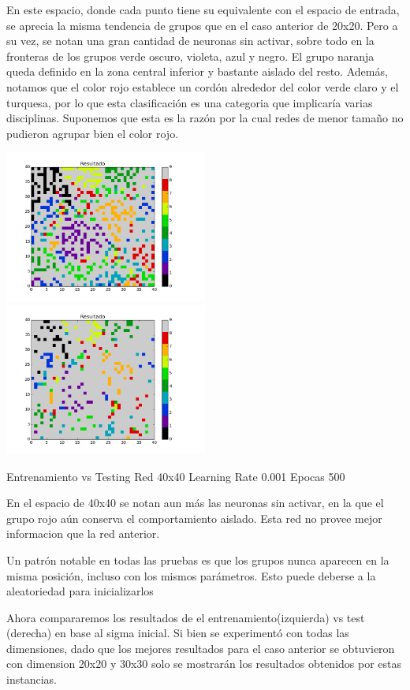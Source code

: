 En este espacio, donde cada punto tiene su equivalente con el espacio de entrada, se aprecia la misma tendencia de grupos que en el caso anterior de 20x20. Pero a su vez, se notan una gran cantidad de neuronas sin activar, sobre todo en la fronteras de los grupos verde oscuro, violeta, azul y negro. El grupo naranja queda definido en la zona central inferior y bastante aislado del resto. Adem\'as, notamos que el color rojo establece un cord\'on alrededor del color verde claro y el turquesa, por lo que esta clasificaci\'on es una categoria que implicar\'ia varias disciplinas. Suponemos que esta es la raz\'on por la cual redes de menor tama\~no no pudieron agrupar bien el color rojo.

\includegraphics[width=0.5\textwidth]{img/ej2_train_M_40_sigma_5_0_epocas_25}
\includegraphics[width=0.5\textwidth]{img/ej2_test_M_40_sigma_5_0_epocas_25}
{\footnotesize Entrenamiento vs Testing Red 40x40 Learning Rate 0.001 Epocas 500\par}	

En el espacio de 40x40 se notan aun m\'as las neuronas sin activar, en la que el grupo rojo a\'un conserva el comportamiento aislado. Esta red no provee mejor informacion que la red anterior.

Un patr\'on notable en todas las pruebas es que los grupos nunca aparecen en la misma posici\'on, incluso con los mismos par\'ametros. Esto puede deberse a la aleatoriedad para inicializarlos

Ahora compararemos los resultados de el entrenamiento(izquierda) vs test (derecha) en base al sigma inicial. Si bien se experiment\'o con todas las dimensiones, dado que los mejores resultados para el caso anterior se obtuvieron con dimension 20x20 y 30x30 solo se mostrar\'an los resultados obtenidos por estas instancias.


